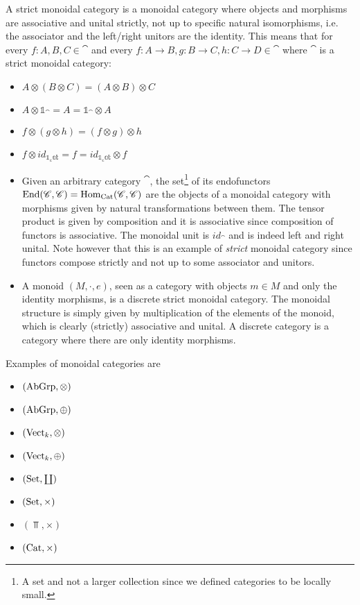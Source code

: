\begin{defn}
    A strict monoidal category is a monoidal category where objects and morphisms are associative and unital strictly, not up to specific natural isomorphisms, i.e. the associator and the left/right unitors are the identity. This means that for every $f:A,B,C\in\cat$ and every $f:A\to B, g:B\to C, h:C\to D\in\cat$ where $\cat$ is a strict monoidal category: \begin{itemize}
        \item $A\otimes(B\otimes C)=(A\otimes B)\otimes C$
        \item $A\otimes \mathbb{1}_\cat=A=\mathbb{1}_\cat\otimes A$
        \item $f\otimes(g\otimes h)=(f\otimes g)\otimes h$
        \item $f\otimes id_\mathbb{1_cat}=f=id_\mathbb{1_cat}\otimes f$
    \end{itemize}
\end{defn}
\begin{ex}
\hfill
    \begin{itemize}
        \item Given an arbitrary category $\cat$, the set\footnote{A set and not a larger collection since we defined categories to be locally small.} of its endofunctors $\operatorname{End}(\mathscr{C},\mathscr{C})=\operatorname{Hom}_{\operatorname{Cat}}(\mathscr{C},\mathscr{C})$ are the objects of a monoidal category with morphisms given by natural transformations between them. The tensor product is given by composition and it is associative since composition of functors is associative. The monoidal unit is $id_\cat$ and is indeed left and right unital. Note however that this is an example of \emph{strict} monoidal category since functors compose strictly and not up to some associator and unitors.
        \item A monoid $(M,\cdot,e)$, seen as a category with objects $m \in M$ and only the identity morphisms, is a discrete strict monoidal category. The monoidal structure is simply given by multiplication of the elements of the monoid, which is clearly (strictly) associative and unital. A discrete category is a category where there are only identity morphisms. 
    \end{itemize} 
\end{ex}
\begin{ex}
    Examples of monoidal categories are \begin{itemize}
        \item $(\operatorname{AbGrp}, \otimes)$
        \item $(\operatorname{AbGrp}, \oplus)$
        \item $(\operatorname{Vect}_k, \otimes)$
        \item $(\operatorname{Vect}_k, \oplus)$
        \item $(\operatorname{Set}, \coprod)$
        \item $(\operatorname{Set}, \times)$
        \item $(\Top, \times)$
        \item $(\operatorname{Cat}, \times)$
    \end{itemize}
\end{ex}